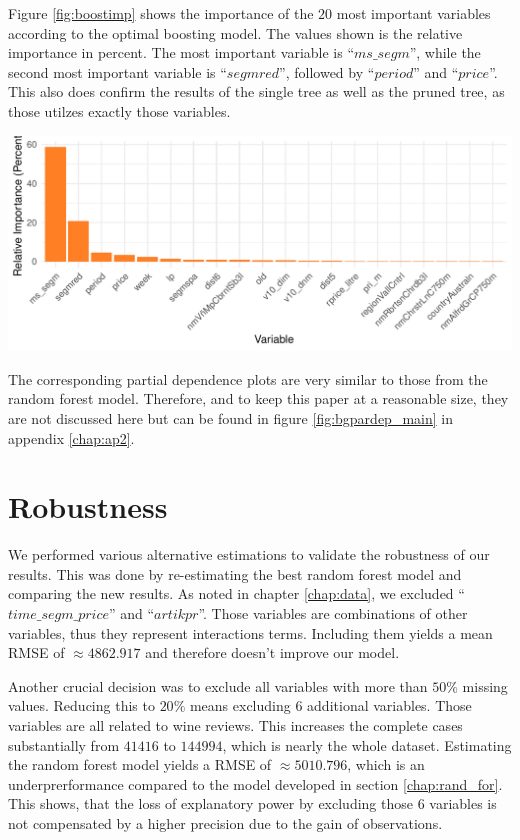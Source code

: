 \documentclass[11pt,]{article}
\let\origfigure\figure
\let\endorigfigure\endfigure
\renewenvironment{figure}[1][2] {
    \expandafter\origfigure\expandafter[H]
} {
    \endorigfigure
}
\begin{document}
Figure \ref{fig:boostimp} shows the importance of the \(20\) most
important variables according to the optimal boosting model. The values
shown is the relative importance in percent. The most important variable
is \enquote{\(ms\_segm\)}, while the second most important variable is
\enquote{\(segmred\)}, followed by \enquote{\(period\)} and
\enquote{\(price\)}. This also does confirm the results of the single
tree as well as the pruned tree, as those utilzes exactly those
variables.

\begin{figure}
\centering
\includegraphics{../00_data/output_paper/12_var_imp_boosting_bp.pdf}
\caption{\label{fig:boostimp}Boosting: Variable Importance Plot.}
\end{figure}

The corresponding partial dependence plots are very similar to those
from the random forest model. Therefore, and to keep this paper at a
reasonable size, they are not discussed here but can be found in figure
\ref{fig:bgpardep_main} in appendix \ref{chap:ap2}.

\hypertarget{robustness}{%
\section{\texorpdfstring{Robustness
\label{chap:rob}}{Robustness }}\label{robustness}}

We performed various alternative estimations to validate the robustness
of our results. This was done by re-estimating the best random forest
model and comparing the new results. As noted in chapter
\ref{chap:data}, we excluded \enquote{\(time\_segm\_price\)} and
\enquote{\(artikpr\)}. Those variables are combinations of other
variables, thus they represent interactions terms. Including them yields
a mean \ac{RMSE} of \(\approx4862.917\) and therefore doesn't improve
our model.

Another crucial decision was to exclude all variables with more than
\(50\%\) missing values. Reducing this to \(20\%\) means excluding \(6\)
additional variables. Those variables are all related to wine reviews.
This increases the complete cases substantially from \(41416\) to
\(144994\), which is nearly the whole dataset. Estimating the random
forest model yields a \ac{RMSE} of \(\approx5010.796\), which is an
underprerformance compared to the model developed in section
\ref{chap:rand_for}. This shows, that the loss of explanatory power by
excluding those \(6\) variables is not compensated by a higher precision
due to the gain of observations.
\end{document}
